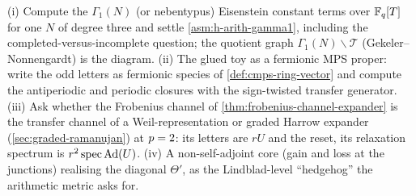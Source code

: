 \begin{observation}
\label{obs:graded-toys-next}
(i) Compute the $\Gamma_1(N)$ (or nebentypus) Eisenstein constant terms over $\mathbb F_q[T]$ for one $N$ of degree
three and settle \cref{asm:h-arith-gamma1}, including the completed-versus-incomplete question; the quotient
graph $\Gamma_1(N)\backslash\mathcal T$ (Gekeler--Nonnengardt) is the diagram. (ii) The glued toy as a
fermionic MPS proper: write the odd letters as fermionic species of \cref{def:cmps-ring-vector} and compute
the antiperiodic and periodic closures with the sign-twisted transfer generator. (iii) Ask whether the Frobenius
channel of \cref{thm:frobenius-channel-expander} is the transfer channel of a Weil-representation or graded
Harrow expander (\cref{sec:graded-ramanujan}) at $p = 2$: its letters are $rU$ and the reset, its relaxation
spectrum is $r^2\operatorname{spec}\operatorname{Ad}(U)$. (iv) A non-self-adjoint core (gain and loss at the junctions)
realising the diagonal $\Theta'$, as the Lindblad-level ``hedgehog'' the arithmetic metric asks for.
\end{observation}
